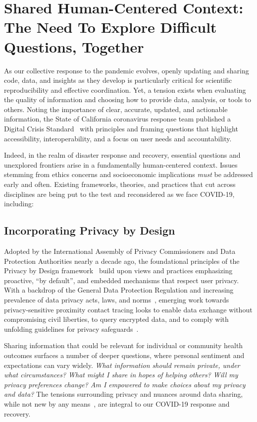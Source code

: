 \section{Shared Human-Centered Context: The Need To Explore Difficult Questions, Together}

As our collective response to the pandemic evolves, openly updating and sharing code, data, and insights as they develop is particularly critical for scientific reproducibility and effective coordination. Yet, a tension exists when evaluating the quality of information and choosing how to provide data, analysis, or tools to others. Noting the importance of clear, accurate, updated, and actionable information, the State of California coronavirus response team published a Digital Crisis Standard~\cite{crisisstandard} with principles and framing questions that highlight accessibility, interoperability, and a focus on user needs and accountability. 

Indeed, in the realm of disaster response and recovery, essential questions and unexplored frontiers arise in a fundamentally human-centered context. Issues stemming from ethics concerns and socioeconomic implications \emph{must} be addressed early and often. Existing frameworks, theories, and practices that cut across disciplines are being put to the test and reconsidered as we face COVID-19, including:

\subsection*{Incorporating Privacy by Design}
Adopted by the International Assembly of Privacy Commissioners and Data Protection Authorities nearly a decade ago, the foundational principles of the Privacy by Design framework~\cite{cavoukian2013privacy} build upon views and practices emphasizing proactive, “by default”, and embedded mechanisms that respect user privacy. With a backdrop of the General Data Protection Regulation and increasing prevalence of data privacy acts, laws, and norms~\cite{GDPR, mares2019iot}, emerging work towards privacy-sensitive proximity contact tracing looks to enable data exchange without compromising civil liberties, to query encrypted data, and to comply with unfolding guidelines for privacy safeguards~\cite{FPFv2}.

Sharing information that could be relevant for individual or community health outcomes surfaces a number of deeper questions, where personal sentiment and expectations can vary widely. \emph{What information should remain private, under what circumstances? What might I share in hopes of helping others? Will my privacy preferences change? Am I empowered to make choices about my privacy and data?} The tensions surrounding privacy and nuances around data sharing, while not new by any means~\cite{10.1007/3-540-45427-6_23, 10.1145/642611.642635}, are integral to our COVID-19 response and recovery.   

